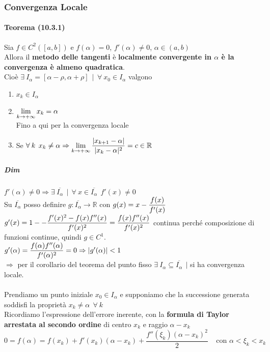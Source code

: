 \documentclass[10pt]{book}
\begin{document}
\subsubsection{Convergenza Locale}
\paragraph{Teorema (10.3.1)} Sia $f\in C^2([a, b])$ e $f(\alpha) = 0$, $f'(\alpha) \neq 0$, $\alpha \in (a, b)$\\
Allora il \textbf{metodo delle tangenti} è \textbf{localmente convergente in $\alpha$ è la convergenza è almeno quadratica}.\\Cioè $\exists\:I_\alpha = [\alpha - \rho, \alpha + \rho]\:\:|\:\:\forall\:x_0\in I_\alpha$ valgono
\begin{enumerate}
	\item $x_k \in I_\alpha$
	\item $\mathlarger{\lim_{k\to+\infty} x_k = \alpha}$\\
	Fino a qui per la convergenza locale
	\item Se $\forall\:k\:\:x_k\neq\alpha \Rightarrow \mathlarger{\lim_{k\to+\infty} \frac{|x_{k+1} - \alpha|}{|x_k - \alpha|^2}} = c \in \mathbb{R}$
\end{enumerate}
\subparagraph{Dim} $f'(\alpha) \neq 0 \Rightarrow \exists\:\overline{I_{\alpha}}\:\:|\:\: \forall\:x\in\overline{I_\alpha}\:\:f'(x)\neq 0$\\
Su $\overline{I_\alpha}$ posso definire $g : \overline{I_\alpha} \rightarrow \mathbb{R}$ con $g(x) = x -\mathlarger{\frac{f(x)}{f'(x)}}$\\
$g'(x) = 1 - -\mathlarger{\frac{f'(x)^2 - f(x)f''(x)}{f'(x)^2}} = \mathlarger{\frac{f(x)f''(x)}{f'(x)^2}}$ continua perché composizione di funzioni continue, quindi $g \in C^1$.\\
$g'(\alpha) = \mathlarger{\frac{f(\alpha)f''(\alpha)}{f'(\alpha)^2}} = 0 \Rightarrow |g'(\alpha)| < 1$\\ $\Rightarrow$ per il corollario del teorema del punto fisso $\exists\:I_\alpha\subseteq\overline{I_\alpha}\:\:|$ si ha convergenza locale.\\\\
Prendiamo un punto iniziale $x_0 \in I_\alpha$ e supponiamo che la successione generata soddisfi la proprietà $x_k \neq \alpha\:\:\forall\: k$\\
Ricordiamo l'espressione dell'errore inerente, con la \textbf{formula di Taylor arrestata al secondo ordine} di centro $x_k$ e raggio $\alpha - x_k$
$$0 = f(\alpha) = f(x_k) + f'(x_k)(\alpha - x_k) + \frac{f''(\xi_k)(\alpha - x_k)^2}{2}\:\:\:\:\:\text{con }\alpha < \xi_k < x_k$$
\end{document}
